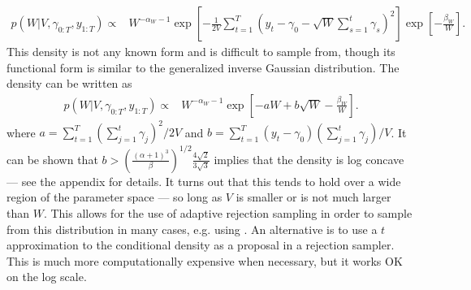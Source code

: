 \documentclass{article}
\begin{document}
\begin{align*}
  p(W|V,\gamma_{0:T},y_{1:T}) \propto & W^{-\alpha_W - 1}\exp\left[-\frac{1}{2V}\sum_{t=1}^T\left(y_t - \gamma_0 - \sqrt{W}\sum_{s=1}^t\gamma_s\right)^2\right]\exp\left[-\frac{\beta_W}{W}\right].
\end{align*}
This density is not any known form and is difficult to sample from, though its functional form is similar to the generalized inverse Gaussian distribution. The density can be written as
\begin{align*}
p(W|V,\gamma_{0:T},y_{1:T}) \propto& W^{-\alpha_W - 1}\exp\left[-aW + b\sqrt{W} -\frac{\beta_W}{W}\right]. 
\end{align*}
where $a=\sum_{t=1}^T(\sum_{j=1}^t\gamma_j)^2/2V$ and $b=\sum_{t=1}^T(y_t-\gamma_0)(\sum_{j=1}^t\gamma_j)/V$. It can be shown that $b > \left(\frac{(\alpha + 1)^3}{\beta}\right)^{1/2}\frac{4\sqrt{2}}{3\sqrt{3}}$ implies that the density is log concave --- see the appendix for details. It turns out that this tends to hold over a wide region of the parameter space --- so long as $V$ is smaller or is not much larger than $W$. This allows for the use of adaptive rejection sampling in order to sample from this distribution in many cases, e.g. using \citet{gilks1992adaptive}. An alternative is to use a $t$ approximation to the conditional density as a proposal in a rejection sampler. This is much more computationally expensive when necessary, but it works OK on the log scale.
\end{document}
